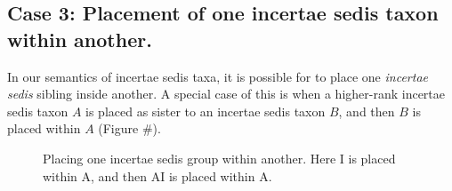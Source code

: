 \documentclass[english]{article}
\newcommand{\lyxdot}{.}
\begin{document}
\subsection{Case 3: Placement of one incertae sedis taxon within
another.}

In our semantics of incertae sedis taxa, it is possible for to place
one \emph{incertae sedis} sibling inside another. A special case of
this is when a higher-rank incertae sedis taxon $A$ is placed as
sister to an incertae sedis taxon $B$, and then $B$ is placed within
$A$ (Figure \#).

\begin{figure}

\caption{\label{fig:Placing-one-incertae}Placing one incertae sedis group
within another. Here I is placed within A, and then AI is placed within
A.}
\end{figure}
\end{document}

